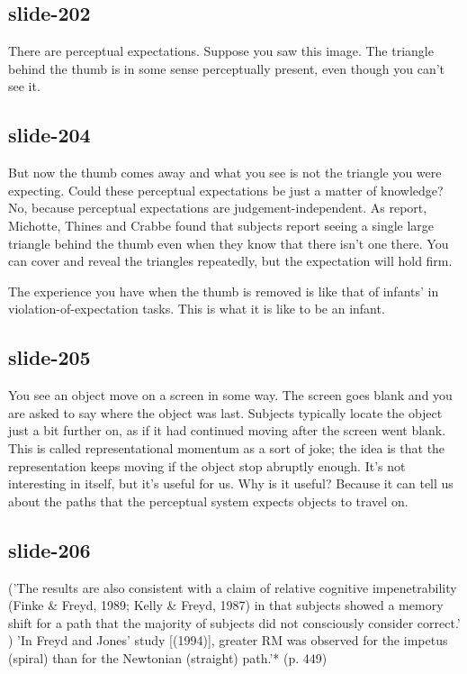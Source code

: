 \documentclass[12pt,\papersize]{extarticle}
\begin{document}
 
\subsection{slide-202}
There are perceptual expectations.
Suppose you saw this image.
The triangle behind the thumb is in some sense perceptually present, even though you can't see it.
 
 
\subsection{slide-204}
But now the thumb comes away and what you see is not the triangle you were expecting.
Could these perceptual expectations be just a matter of knowledge?
No, because perceptual expectations are judgement-independent.
As \citep{kellman:1983_perception} report, Michotte, Thines and Crabbe found that subjects report seeing a single large triangle behind the thumb even when they know that there isn't one there.
You can cover and reveal the triangles repeatedly, but the expectation will hold firm.
 
The experience you have when the thumb is removed is like that of infants' in violation-of-expectation tasks.
This is what it is like to be an infant.
 
 
\subsection{slide-205}
You see an object move on a screen in some way.
The screen goes blank and you are asked to say where the object was last.
Subjects typically locate the object just a bit further on, as if it had continued moving after the screen went blank.
This is called representational momentum as a sort of joke; the idea is that the representation keeps moving if the object stop abruptly enough.
It's not interesting in itself, but it's useful for us.
Why is it useful? Because it can tell us about the paths that the perceptual system expects objects to travel on.
 
 
\subsection{slide-206}
\citep{freyd:1994_representational} ('The results are also consistent with a claim of relative cognitive impenetrability (Finke \& Freyd, 1989; Kelly \& Freyd, 1987) in that subjects showed a memory shift for a path that the majority of subjects did not consciously consider correct.' \citep[p.\ 975]{freyd:1994_representational})
'In Freyd and Jones’ study [(1994)], greater RM was observed for the impetus (spiral) than for the Newtonian (straight) path.'* (p. 449)
 
\end{document}
